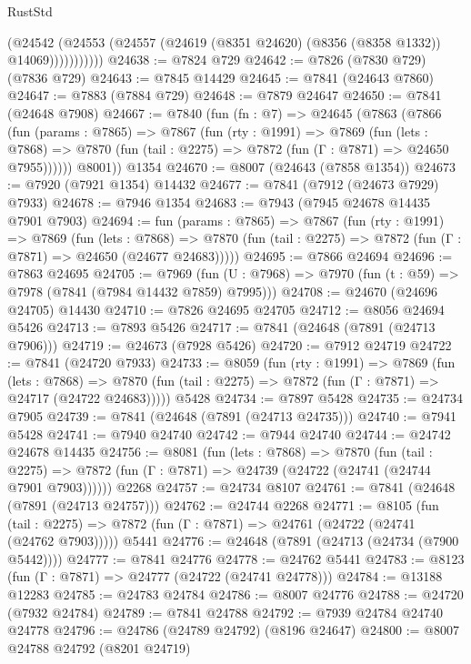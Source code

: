 \begin{lexlean}{RustStd}
\begin{coremodule}
{\begin{coremodule}
{{{{{{{{{{{{{{{{{{{{{{{{{{{{{{{{{{{{{{{{{{{{{{{{{{{{{{                  (@24542
                    (@24553 (@24557 (@24619 (@8351 @24620) (@8356 (@8358 @1332)) @14069)))))))))))
@24638 := @7824 @729
@24642 := @7826 (@7830 @729) (@7836 @729)
@24643 := @7845 @14429
@24645 := @7841 (@24643 @7860)
@24647 := @7883 (@7884 @729)
@24648 := @7879 @24647
@24650 := @7841 (@24648 @7908)
@24667 := @7840
    (fun (fn : @7) =>
    @24645
      (@7863
        (@7866
          (fun (params : @7865) =>
          @7867
            (fun (rty : @1991) =>
            @7869
              (fun (lets : @7868) =>
              @7870 (fun (tail : @2275) => @7872 (fun (Γ : @7871) => @24650 @7955))))))
        @8001))
    @1354
@24670 := @8007 (@24643 (@7858 @1354))
@24673 := @7920 (@7921 @1354) @14432
@24677 := @7841 (@7912 (@24673 @7929) @7933)
@24678 := @7946 @1354
@24683 := @7943 (@7945 @24678 @14435 @7901 @7903)
@24694 := fun (params : @7865) =>
  @7867
    (fun (rty : @1991) =>
    @7869
      (fun (lets : @7868) =>
      @7870 (fun (tail : @2275) => @7872 (fun (Γ : @7871) => @24650 (@24677 @24683)))))
@24695 := @7866 @24694
@24696 := @7863 @24695
@24705 := @7969
    (fun (U : @7968) => @7970 (fun (t : @59) => @7978 (@7841 (@7984 @14432 @7859) @7995)))
@24708 := @24670 (@24696 @24705) @14430
@24710 := @7826 @24695 @24705
@24712 := @8056 @24694 @5426
@24713 := @7893 @5426
@24717 := @7841 (@24648 (@7891 (@24713 @7906)))
@24719 := @24673 (@7928 @5426)
@24720 := @7912 @24719
@24722 := @7841 (@24720 @7933)
@24733 := @8059
    (fun (rty : @1991) =>
    @7869
      (fun (lets : @7868) =>
      @7870 (fun (tail : @2275) => @7872 (fun (Γ : @7871) => @24717 (@24722 @24683)))))
    @5428
@24734 := @7897 @5428
@24735 := @24734 @7905
@24739 := @7841 (@24648 (@7891 (@24713 @24735)))
@24740 := @7941 @5428
@24741 := @7940 @24740
@24742 := @7944 @24740
@24744 := @24742 @24678 @14435
@24756 := @8081
    (fun (lets : @7868) =>
    @7870
      (fun (tail : @2275) =>
      @7872 (fun (Γ : @7871) => @24739 (@24722 (@24741 (@24744 @7901 @7903))))))
    @2268
@24757 := @24734 @8107
@24761 := @7841 (@24648 (@7891 (@24713 @24757)))
@24762 := @24744 @2268
@24771 := @8105
    (fun (tail : @2275) => @7872 (fun (Γ : @7871) => @24761 (@24722 (@24741 (@24762 @7903)))))
    @5441
@24776 := @24648 (@7891 (@24713 (@24734 (@7900 @5442))))
@24777 := @7841 @24776
@24778 := @24762 @5441
@24783 := @8123 (fun (Γ : @7871) => @24777 (@24722 (@24741 @24778)))
@24784 := @13188 @12283
@24785 := @24783 @24784
@24786 := @8007 @24776
@24788 := @24720 (@7932 @24784)
@24789 := @7841 @24788
@24792 := @7939 @24784 @24740 @24778
@24796 := @24786 (@24789 @24792) (@8196 @24647)
@24800 := @8007 @24788 @24792 (@8201 @24719)
}}}}}}}}}}}}}}}}}}}}}}}}}}}}}}}}}}}}}}}}}}}}}}}}}}}}}}
\end{coremodule}}
\end{coremodule}
\end{lexlean}
